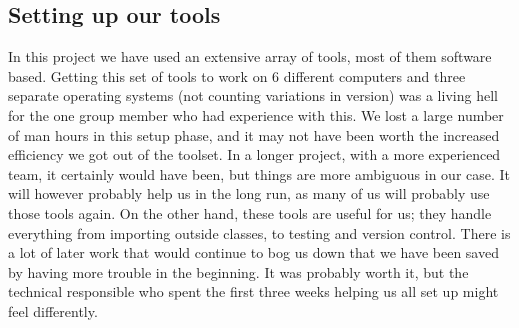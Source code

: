 \subsection{Setting up our tools}
In this project we have used an extensive array of tools, most of them software based. Getting this set of tools to work on 6 different computers and three separate operating systems (not counting variations in version) was a living hell for the one group member who had experience with this.
\newline
\newline
We lost a large number of man hours in this setup phase, and it may not have been worth the increased efficiency we got out of the toolset. In a longer project, with a more experienced team, it certainly would have been, but things are more ambiguous in our case. It will however probably help us in the long run, as many of us will probably use those tools again.
\newline
\newline
On the other hand, these tools are useful for us; they handle everything from importing outside classes, to testing and version control. There is a lot of later work that would continue to bog us down that we have been saved by having more trouble in the beginning. It was probably worth it, but the technical responsible who spent the first three weeks helping us all set up might feel differently.

